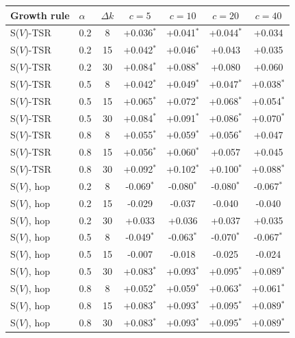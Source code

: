 \begin{tabular}{llccccc}
\toprule
Growth rule & $\alpha$ & $\Delta k$ & $c{=}5$ & $c{=}10$ & $c{=}20$ & $c{=}40$ \\
\midrule
S($V$)-TSR & 0.2 & 8 & +0.036$^{*}$ & +0.041$^{*}$ & +0.044$^{*}$ & +0.034 \\
S($V$)-TSR & 0.2 & 15 & +0.042$^{*}$ & +0.046$^{*}$ & +0.043 & +0.035 \\
S($V$)-TSR & 0.2 & 30 & +0.084$^{*}$ & +0.088$^{*}$ & +0.080 & +0.060 \\
S($V$)-TSR & 0.5 & 8 & +0.042$^{*}$ & +0.049$^{*}$ & +0.047$^{*}$ & +0.038$^{*}$ \\
S($V$)-TSR & 0.5 & 15 & +0.065$^{*}$ & +0.072$^{*}$ & +0.068$^{*}$ & +0.054$^{*}$ \\
S($V$)-TSR & 0.5 & 30 & +0.084$^{*}$ & +0.091$^{*}$ & +0.086$^{*}$ & +0.070$^{*}$ \\
S($V$)-TSR & 0.8 & 8 & +0.055$^{*}$ & +0.059$^{*}$ & +0.056$^{*}$ & +0.047 \\
S($V$)-TSR & 0.8 & 15 & +0.056$^{*}$ & +0.060$^{*}$ & +0.057 & +0.045 \\
S($V$)-TSR & 0.8 & 30 & +0.092$^{*}$ & +0.102$^{*}$ & +0.100$^{*}$ & +0.088$^{*}$ \\
S($V$), hop & 0.2 & 8 & -0.069$^{*}$ & -0.080$^{*}$ & -0.080$^{*}$ & -0.067$^{*}$ \\
S($V$), hop & 0.2 & 15 & -0.029 & -0.037 & -0.040 & -0.040 \\
S($V$), hop & 0.2 & 30 & +0.033 & +0.036 & +0.037 & +0.035 \\
S($V$), hop & 0.5 & 8 & -0.049$^{*}$ & -0.063$^{*}$ & -0.070$^{*}$ & -0.067$^{*}$ \\
S($V$), hop & 0.5 & 15 & -0.007 & -0.018 & -0.025 & -0.024 \\
S($V$), hop & 0.5 & 30 & +0.083$^{*}$ & +0.093$^{*}$ & +0.095$^{*}$ & +0.089$^{*}$ \\
S($V$), hop & 0.8 & 8 & +0.052$^{*}$ & +0.059$^{*}$ & +0.063$^{*}$ & +0.061$^{*}$ \\
S($V$), hop & 0.8 & 15 & +0.083$^{*}$ & +0.093$^{*}$ & +0.095$^{*}$ & +0.089$^{*}$ \\
S($V$), hop & 0.8 & 30 & +0.083$^{*}$ & +0.093$^{*}$ & +0.095$^{*}$ & +0.089$^{*}$ \\
\bottomrule
\end{tabular}
